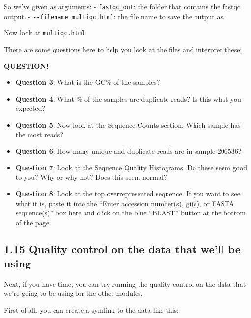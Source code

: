 \documentclass[
]{book}
\providecommand{\tightlist}{%
  \setlength{\itemsep}{0pt}\setlength{\parskip}{0pt}}
\newenvironment{bluebox}{
  \definecolor{shadecolor}{RGB}{172, 210, 237}
  \color{white}
  \begin{shaded}}
 {\end{shaded}}
\begin{document}
So we've given as arguments:
- \texttt{fastqc\_out}: the folder that contains the fastqc output.
- \texttt{-\/-filename\ multiqc.html}: the file name to save the output as.

Now look at \texttt{multiqc.html}.

There are some questions here to help you look at the files and interpret these:

\begin{bluebox}

\begin{center}
\textbf{QUESTION!}

\end{center}

\begin{itemize}
\tightlist
\item
  \textbf{Question 3}: What is the GC\% of the samples?
\item
  \textbf{Question 4}: What \% of the samples are duplicate reads? Is this what you expected?
\item
  \textbf{Question 5}: Now look at the Sequence Counts section. Which sample has the most reads?
\item
  \textbf{Question 6}: How many unique and duplicate reads are in sample 206536?
\item
  \textbf{Question 7}: Look at the Sequence Quality Histograms. Do these seem good to you? Why or why not? Does this seem normal?
\item
  \textbf{Question 8}: Look at the top overrepresented sequence. If you want to see what it is, paste it into the ``Enter accession number(s), gi(s), or FASTA sequence(s)'' box \href{https://blast.ncbi.nlm.nih.gov/Blast.cgi?PROGRAM=blastn&PAGE_TYPE=BlastSearch&LINK_LOC=blasthome}{here} and click on the blue ``BLAST'' button at the bottom of the page.
\end{itemize}

\end{bluebox}

\subsection{1.15 Quality control on the data that we'll be using}\label{quality-control-on-the-data-that-well-be-using}

Next, if you have time, you can try running the quality control on the data that we're going to be using for the other modules.

First of all, you can create a symlink to the data like this:
\end{document}
